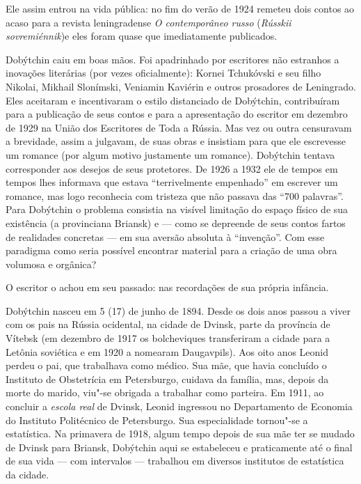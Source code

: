 Ele assim entrou na vida pública: no fim do verão de 1924 remeteu dois
contos ao acaso para a revista leningradense \emph{O contemporâneo
russo} (\emph{Rússkii sovremiénnik})e eles foram quase que imediatamente publicados.

Dobýtchin caiu em boas mãos. Foi apadrinhado por escritores não
estranhos a inovações literárias (por vezes oficialmente): Kornei
Tchukóvski e seu filho Nikolai, Mikhail Slonímski, Veniamin Kaviérin e
outros prosadores de Leningrado. Eles aceitaram e incentivaram o estilo
distanciado de Dobýtchin, contribuíram para a publicação de seus contos
e para a apresentação do escritor em dezembro de 1929 na União dos
Escritores de Toda a Rússia. Mas vez ou outra censuravam a brevidade,
assim a julgavam, de suas obras e insistiam para que ele escrevesse um
romance (por algum motivo justamente um romance). Dobýtchin tentava
corresponder aos desejos de seus protetores. De 1926 a 1932 ele de
tempos em tempos lhes informava que estava ``terrivelmente empenhado''
em escrever um romance, mas logo reconhecia com tristeza que não passava
das ``700 palavras''. Para Dobýtchin o problema consistia na visível
limitação do espaço físico de sua existência (a provinciana Briansk) e
--- como se depreende de seus contos fartos de realidades concretas ---
em sua aversão absoluta à ``invenção''. Com esse paradigma como seria
possível encontrar material para a criação de uma obra volumosa e
orgânica?

O escritor o achou em seu passado: nas recordações de sua própria
infância.

Dobýtchin nasceu em 5 (17) de junho de 1894. Desde os dois anos passou a %
viver com os pais na Rússia ocidental, na cidade de Dvinsk, parte da
província de Vítebsk (em dezembro de 1917 os bolcheviques transferiram a
cidade para a Letônia soviética e em 1920 a nomearam Daugavpils). Aos
oito anos Leonid perdeu o pai, que trabalhava como médico. Sua mãe, que
havia concluído o Instituto de Obstetrícia em Petersburgo, cuidava da
família, mas, depois da morte do marido, viu"-se obrigada a trabalhar
como parteira. Em 1911, ao concluir a \emph{escola real} de Dvinsk,
Leonid ingressou no Departamento de Economia do Instituto Politécnico de
Petersburgo. Sua especialidade tornou"-se a estatística. Na primavera de
1918, algum tempo depois de sua mãe ter se mudado de Dvinsk para
Briansk, Dobýtchin aqui se estabeleceu e praticamente até o final de sua
vida --- com intervalos --- trabalhou em diversos institutos de estatística
da cidade.

